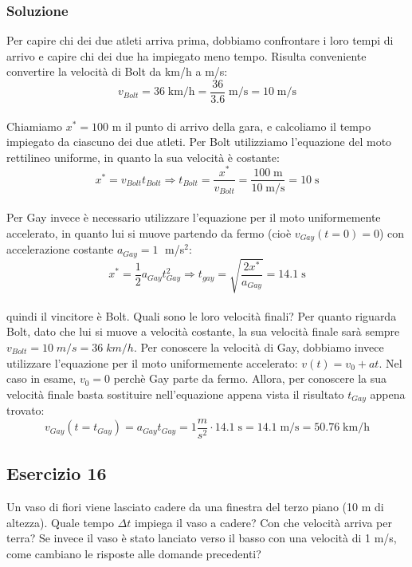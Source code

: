 \documentclass[12pt,a4paper]{book}
\begin{document}
\subsubsection*{Soluzione}
Per capire chi dei due atleti arriva prima, dobbiamo confrontare i loro tempi di arrivo e capire chi dei due ha impiegato meno tempo. Risulta conveniente convertire la velocità di Bolt da km/h a m/s:\\
\begin{equation*}
v_{Bolt} = 36 \; \text{km/h} = \frac{36}{3.6} \; \text{m/s} = 10 \; \text{m/s}
\end{equation*}\\
Chiamiamo $x^*=100$ m il punto di arrivo della gara, e calcoliamo il tempo impiegato da ciascuno dei due atleti. Per Bolt utilizziamo l'equazione del moto rettilineo uniforme, in quanto la sua velocità è costante:\\
\begin{equation*}
x^*=v_{Bolt}  t_{Bolt} \Longrightarrow t_{Bolt} = \frac{x^*}{v_{Bolt}}=\frac{100 \; \text{m}}{10 \; \text{m/s}}= 10\; \text{s}
\end{equation*}\\
Per Gay invece è necessario utilizzare l'equazione per il moto uniformemente accelerato, in quanto lui si muove partendo da fermo (cioè $v_{Gay}(t=0)=0$) con accelerazione costante $a_{Gay} = 1 \;$ m/s$^2$:\\
\begin{equation*}
x^*= \frac{1}{2} a_{Gay}  t_{Gay}^2 \Longrightarrow t_{gay}= \sqrt{\frac{2x^*}{a_{Gay}}}= 14.1 \; \text{s}
\end{equation*}\\
quindi il vincitore è Bolt. Quali sono le loro velocità finali? Per quanto riguarda Bolt, dato che lui si muove a velocità costante, la sua velocità finale sarà sempre $v_{Bolt}= 10 \; m/s = 36 \; km/h$. Per conoscere la velocità di Gay, dobbiamo invece utilizzare l'equazione per il moto uniformemente accelerato: $v(t)= v_0 + at$. Nel caso in esame, $v_0 = 0$ perchè Gay parte da fermo. Allora, per conoscere la sua velocità finale basta sostituire nell'equazione appena vista il risultato $t_{Gay}$ appena trovato:\\
\begin{equation*}
v_{Gay} (t=t_{Gay})= a_{Gay} t_{Gay} = 1 \frac{m}{s^2}\cdot 14.1 \;\text{s} = 14.1 \; \text{m/s} = 50.76 \; \text{km/h}
\end{equation*}

\subsection*{Esercizio 16}
Un vaso di fiori viene lasciato cadere da una finestra del terzo piano (10 m di altezza). Quale tempo $\Delta t$ impiega il vaso a cadere? Con che velocità arriva per terra? Se invece il vaso è stato lanciato verso il basso con una velocità di 1 m/s, come cambiano le risposte alle domande precedenti?
\end{document}
